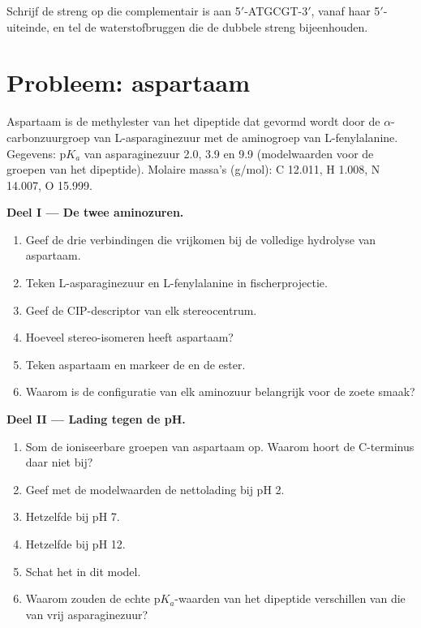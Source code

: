\begin{exercise}[$\star\star\star$]\label{exo:b2:biomolecules:12}
Schrijf de streng op die complementair is aan 5$'$-ATGCGT-3$'$, vanaf haar 5$'$-uiteinde, en tel de waterstofbruggen
die de dubbele streng bijeenhouden.
\end{exercise}

\section{Probleem: aspartaam}

\begin{problem}
\label{pb:b2:biomolecules:1}
Aspartaam is de methylester van het dipeptide dat gevormd wordt door de $\alpha$-carbonzuurgroep van L-asparaginezuur
met de aminogroep van L-fenylalanine. Gegevens: $\mathrm pK_a$ van asparaginezuur 2.0, 3.9 en 9.9 (modelwaarden
voor de groepen van het dipeptide). Molaire massa's (\unit{g/mol}): C 12.011, H 1.008, N 14.007,
O 15.999.

\medskip
\noindent\textbf{Deel I --- De twee aminozuren.}
\begin{enumerate}
  \item Geef de drie verbindingen die vrijkomen bij de volledige hydrolyse van aspartaam.
  \item Teken L-asparaginezuur en L-fenylalanine in fischerprojectie.
  \item Geef de CIP-descriptor van elk stereocentrum.
  \item Hoeveel stereo-isomeren heeft aspartaam?
  \item Teken aspartaam en markeer de  en de ester.
  \item Waarom is de configuratie van elk aminozuur belangrijk voor de zoete smaak?
\end{enumerate}

\medskip
\noindent\textbf{Deel II --- Lading tegen de pH.}
\begin{enumerate}[resume]
  \item Som de ioniseerbare groepen van aspartaam op. Waarom hoort de C-terminus daar niet bij?
  \item Geef met de modelwaarden de nettolading bij pH 2.
  \item Hetzelfde bij pH 7.
  \item Hetzelfde bij pH 12.
  \item Schat het  in dit model.
  \item Waarom zouden de echte $\mathrm pK_a$-waarden van het dipeptide verschillen van die van vrij
        asparaginezuur?
\end{enumerate}


\end{problem}
